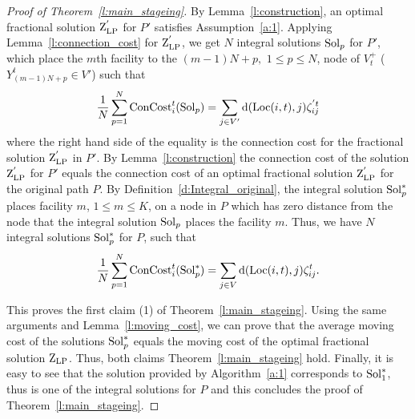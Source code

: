 \begin{proof}[Proof of Theorem~\ref{l:main_stageing}]
By Lemma~\ref{l:construction}, an optimal fractional solution $\mathrm{Z}_{\mathrm{LP}}^{'}$ for $P'$ satisfies Assumption~\ref{a:1}. Applying Lemma~\ref{l:connection_cost} for $\mathrm{Z}_{\mathrm{LP}}^{'}$, we get $N$ integral solutions $\mathrm{Sol}_p$ for $P'$, which place the $m$th facility to the $(m-1)N + p,$ $1\leq p\leq N$, node of $V^{+}_t$ 
($Y^{t}_{(m-1)N + p} \in V'$) such that  
\[\frac{1}{N}\sum_{p=1}^N \mathrm{ConCost}^t_i(\mathrm{Sol}_p) =\sum_{j\in V'} 
\mathrm{d}(\mathrm{Loc}(i,t),j)\zeta_{ij}^{'t}
\]
where the right hand side of the equality is the connection cost for the fractional solution $\mathrm{Z}_{\mathrm{LP}}^{'}$ in $P'$. By Lemma~\ref{l:construction} the connection cost of the solution $\mathrm{Z}_{\mathrm{LP}}^{'}$ for $P'$ equals the connection cost of an optimal fractional solution $\mathrm{Z}_{\mathrm{LP}}^{'}$ for the original path $P$. By Definition~\ref{d:Integral_original}, the integral solution $\mathrm{Sol}_p^*$  places facility $m$, $1 \leq m \leq K$, on a node in $P$ which has zero distance from the node that the integral solution $\mathrm{Sol}_p$ places the facility $m$.   
Thus, we have $N$ integral solutions $\mathrm{Sol}_p^*$ for 
$P$, such that
\[\frac{1}{N}\sum_{p=1}^{N} \mathrm{ConCost}^t_i(\mathrm{Sol}_p^*) =\sum_{j\in V} 
\mathrm{d}(\mathrm{Loc}(i,t),j)\zeta_{ij}^t
.\]

This proves the first claim (1) of Theorem~\ref{l:main_stageing}. Using the same arguments and  Lemma~\ref{l:moving_cost}, we can prove that the average moving cost of the solutions $\mathrm{Sol}_p^*$ equals the moving cost of the optimal fractional solution $\mathrm{Z}_{\mathrm{LP}}$.
Thus, both claims Theorem~\ref{l:main_stageing} hold. Finally, it is easy to see that the solution provided by Algorithm~\ref{a:1} corresponds to $\mathrm{Sol}_1^*$, 
thus is one of the integral solutions for $P$ and this concludes the proof of Theorem~\ref{l:main_stageing}.
\end{proof}